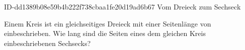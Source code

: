 \begin{exercise}
      {ID-dd1389b08e59b4b222f738cbaa1fe20d19ad6b67}
      {Vom Dreieck zum Sechseck}
  \ifproblem\problem\par
    Einem Kreis ist ein gleichseitiges Dreieck mit einer Seitenlänge von
     einbeschrieben. Wie lang sind die Seiten eines dem gleichen
    Kreis einbeschriebenen Sechsecks?
  \fi
\end{exercise}
